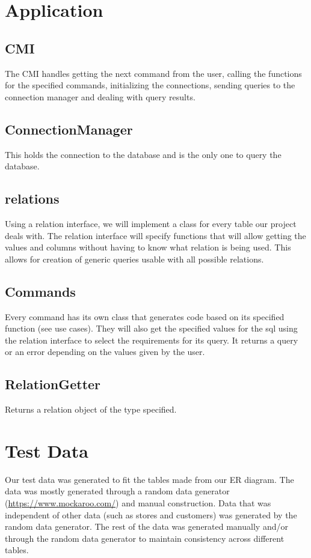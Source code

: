 \documentclass{article}
\begin{document}
	\section{Application}
	
		\subsection{CMI}
			The CMI handles getting the next command from the user, calling the functions for the specified commands,
			initializing the connections, sending queries to the connection manager and dealing with query results. 
			
		\subsection{ConnectionManager}
			This holds the connection to the database and is the only one to query the database. 
			
		\subsection{relations}
			Using a relation interface, we will implement a class for every table our project deals with. The relation
			interface will specify functions that will allow getting the values and columns without having to know what
			relation is being used. This allows for creation of generic queries usable with all possible relations.
			
		\subsection{Commands}
			Every command has its own class that generates code based on its specified function (see use cases). 
			They will also get the specified values for the sql using the relation interface to select the requirements
			for its query. It returns a query or an error depending on the values given by the user.
			
		\subsection{RelationGetter}
			Returns a relation object of the type specified. 


	\section{Test Data}
		Our test data was generated to fit the tables made from our ER diagram. The
		data was mostly generated through a random data generator
		(\url{https://www.mockaroo.com/}) and manual construction. Data that was
		independent of other data (such as stores and customers) was generated by
		the random data generator. The rest of the data was generated manually
		and/or through the random data generator to maintain consistency across
		different tables.
\end{document}
